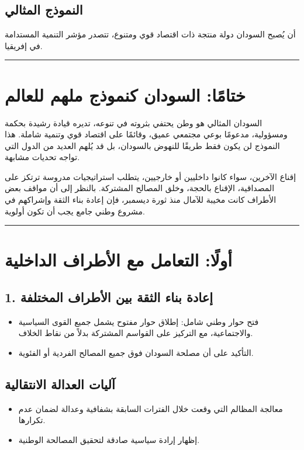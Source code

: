\documentclass[12pt]{article}
\begin{document}
\subsection{النموذج المثالي}
أن يُصبح السودان دولة منتجة ذات اقتصاد قوي ومتنوع، تتصدر مؤشر التنمية المستدامة في إفريقيا.

\hrule

\section{ختامًا: السودان كنموذج ملهم للعالم}
السودان المثالي هو وطن يحتفي بثروته في تنوعه، تديره قيادة رشيدة بحكمة ومسؤولية، مدعومًا بوعي مجتمعي عميق، وقائمًا على اقتصاد قوي وتنمية شاملة. هذا النموذج لن يكون فقط طريقًا للنهوض بالسودان، بل قد يُلهم العديد من الدول التي تواجه تحديات مشابهة. 

إقناع الآخرين، سواء كانوا داخليين أو خارجيين، يتطلب استراتيجيات مدروسة ترتكز على المصداقية، الإقناع بالحجة، وخلق المصالح المشتركة. بالنظر إلى أن مواقف بعض الأطراف كانت مخيبة للآمال منذ ثورة ديسمبر، فإن إعادة بناء الثقة وإشراكهم في مشروع وطني جامع يجب أن تكون أولوية.

\hrule

\section{أولًا: التعامل مع الأطراف الداخلية}
\subsection{1. إعادة بناء الثقة بين الأطراف المختلفة}
\begin{itemize}
    \item فتح حوار وطني شامل: إطلاق حوار مفتوح يشمل جميع القوى السياسية والاجتماعية، مع التركيز على القواسم المشتركة بدلاً من نقاط الخلاف.
    \item التأكيد على أن مصلحة السودان فوق جميع المصالح الفردية أو الفئوية.
\end{itemize}

\subsection{آليات العدالة الانتقالية}
\begin{itemize}
    \item معالجة المظالم التي وقعت خلال الفترات السابقة بشفافية وعدالة لضمان عدم تكرارها.
    \item إظهار إرادة سياسية صادقة لتحقيق المصالحة الوطنية.
\end{itemize}
\end{document}
